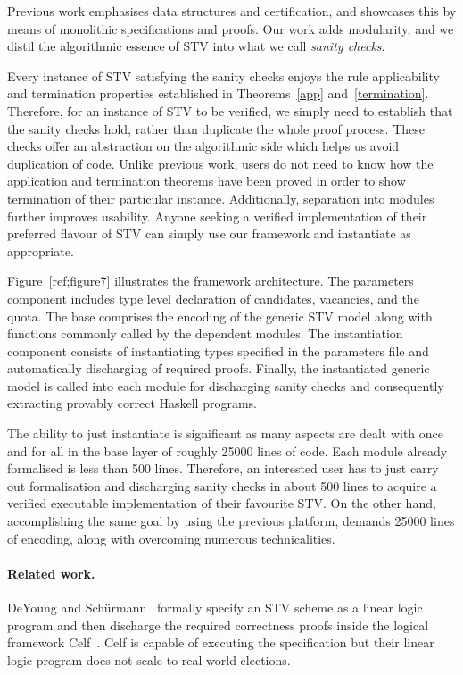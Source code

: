\documentclass{llncs}
\begin{document}
Previous work emphasises data structures and certification, and showcases this by means of monolithic specifications and proofs. Our work adds modularity,  and we distil the algorithmic essence of STV into what we call \emph{sanity checks}.

Every instance of STV satisfying the sanity checks enjoys the rule applicability and termination properties established in Theorems~\ref{app} and~\ref{termination}. Therefore, for an instance of STV to be verified, we simply need to  establish that the sanity checks hold, 
rather than duplicate the whole proof process. These checks
offer an abstraction on the algorithmic side which helps us
avoid duplication of code. Unlike previous work, users do
not need to know how the application  and termination theorems have been proved in order to show termination of their particular instance. Additionally, separation into modules further improves usability. Anyone seeking a verified implementation of their preferred flavour of STV can simply use our framework and instantiate as appropriate. 

Figure~\ref{ref;figure7} illustrates the framework architecture. The
parameters component includes type level declaration of candidates,
vacancies, and the quota. The base comprises the encoding of the
generic STV model along with functions commonly called by the
dependent modules. The  instantiation component consists of
instantiating types specified in the parameters file and
automatically discharging of required proofs. Finally, the
instantiated generic model is called into each module for
discharging sanity checks and consequently extracting provably
correct Haskell programs.
   

The ability to just instantiate is significant as many
aspects are dealt with once and for all
in the base layer of roughly 25000 lines of
code. Each module already formalised is less than 500 lines.
Therefore, an interested user has to just carry out formalisation and discharging sanity checks in about 500 lines to acquire a verified executable implementation of their favourite STV. On the other hand, accomplishing the same goal by using the previous platform, demands  25000 lines of encoding, along with overcoming numerous technicalities.   

\paragraph{\textbf{Related work.}}
DeYoung and Sch\"urmann~\cite{DeYoung:2012:LLV}
formally specify an STV
scheme as a linear logic~\cite{DBLP:journals/apal/Girard93} program
and then discharge the required correctness 
proofs inside the logical framework
Celf~\cite{DBLP:conf/cade/Schack-NielsenS08}. Celf is capable of
executing the specification but their linear logic program does not scale to real-world
elections.
\end{document}
